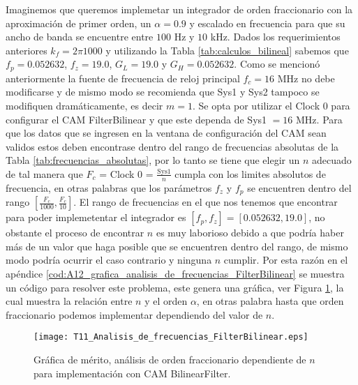 	Imaginemos que queremos implemetar un integrador de orden fraccionario con la aproximación de primer orden, un $\alpha = 0.9$ y escalado en frecuencia para que su ancho de banda se encuentre entre $100$ Hz y $10$ kHz. Dados los requerimientos anteriores $k_{f} = 2 \pi 1000$ y utilizando la Tabla \ref{tab:calculos_bilineal} sabemos que $f_{p} = 0.052632$, $f_{z} = 19.0$, $G_{L} = 19.0$ y $G_{H} = 0.052632$. Como se mencionó anteriormente la fuente de frecuencia de reloj principal $f_{c} = 16$ MHz no debe modificarse y de mismo modo se recomienda que Sys1 y Sys2 tampoco se modifiquen dramáticamente, es decir $m = 1$. Se opta por utilizar el Clock 0 para configurar el CAM FilterBilinear y que este dependa de Sys1 $=16$ MHz. Para que los datos que se ingresen en la ventana de configuración del CAM sean validos estos deben encontrase dentro del rango de frecuencias absolutas de la Tabla \ref{tab:frecuencias_absolutas}, por lo tanto se tiene que elegir un $n$ adecuado de tal manera que $F_{c}$ = Clock 0 = $\frac{\mathrm{Sys1}}{n}$ cumpla con los limites absolutos de frecuencia, en otras palabras que los parámetros $f_{z}$ y $f_{p}$ se encuentren dentro del rango $[\frac{F_{c}}{1000}, \frac{F_{c}}{10}]$. El rango de frecuencias en el que nos tenemos que encontrar para poder implemetentar el integrador es $[f_{p},f_{z}] = [0.052632, 19.0]$, no obstante el proceso de encontrar $n$ es muy laborioso debido a que podría haber más de un valor que haga posible que se encuentren dentro del rango, de mismo modo podría ocurrir el caso contrario y ninguna $n$ cumplir. Por esta razón en el apéndice \ref{cod:A12_grafica_analisis_de_frecuencias_FilterBilinear} se muestra un código para resolver este problema, este genera una gráfica, ver Figura \ref{fig:T11_Analisis_de_frecuencias_FilterBilinear}, la cual muestra la relación entre $n$ y el orden $\alpha$, en otras palabra hasta que orden fraccionario podemos implementar dependiendo del valor de $n$.

	\begin{figure}[hbtp]
		\caption{Gráfica de mérito, análisis de orden fraccionario dependiente de $n$ para implementación con CAM BilinearFilter.} 
		\label{fig:T11_Analisis_de_frecuencias_FilterBilinear}
		\centering
		\texttt{[image: T11\_Analisis\_de\_frecuencias\_FilterBilinear.eps]}
	\end{figure}

